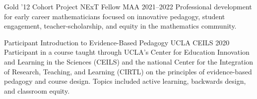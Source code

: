 

\begin{cventries}

\cventry
    {Gold '12 Cohort}
    {Project NExT Fellow}
    {MAA}
    {2021--2022}
    {Professional development for early career mathematicians focused on innovative pedagogy, student engagement, teacher-scholarship, and equity in the mathematics community.}
    
\cventry
    {Participant}
    {Introduction to Evidence-Based Pedagogy}
    {UCLA CEILS}
    {2020}
    {Participant in a course taught through UCLA's Center for Education Innovation and Learning in the Sciences (CEILS) and the 
    national Center for the Integration of Research, Teaching, and Learning (CIRTL) on the principles of evidence-based pedagogy and course design. 
    Topics included active learning, backwards design, and classroom equity. 
    }


\end{cventries}
